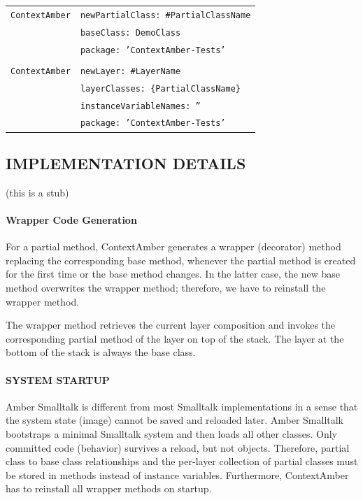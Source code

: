 \documentclass[english,paper=a4,twocolumn=true,DIV=calc,fontsize=9pt]{scrartcl}
\begin{document}
\begin{table}[h]
    \begin{tabular}{ll}
        \texttt{ContextAmber} & \texttt{newPartialClass: \#PartialClassName} \\
         & \texttt{baseClass: DemoClass} \\
         & \texttt{package: 'ContextAmber-Tests'} \\
       \\
        \texttt{ContextAmber} & \texttt{newLayer: \#LayerName} \\
        & \texttt{layerClasses: \{PartialClassName\}} \\
        & \texttt{instanceVariableNames: ''} \\
        & \texttt{package: 'ContextAmber-Tests'} 
    \end{tabular}
\end{table}

\subsection{IMPLEMENTATION DETAILS}
(this is a stub)

\paragraph{Wrapper Code Generation}
For a partial method, ContextAmber generates a wrapper (decorator) method replacing the corresponding base method, whenever the partial method is created for the first time or the base method changes. In the latter case, the new base method overwrites the wrapper method; therefore, we have to reinstall the wrapper method.

The wrapper method retrieves the current layer composition and invokes the corresponding partial method of the layer on top of the stack. The layer at the bottom of the stack is always the base class.

\paragraph{SYSTEM STARTUP}
Amber Smalltalk is different from most Smalltalk implementations in a sense that the system state (image) cannot be saved and reloaded later. Amber Smalltalk bootstraps a minimal Smalltalk system and then loads all other classes. Only committed code (behavior) survives a reload, but not objects. Therefore, partial class to base class relationships and the per-layer collection of partial classes must be stored in methods instead of instance variables. Furthermore, ContextAmber has to reinstall all wrapper methods on startup.
\end{document}
